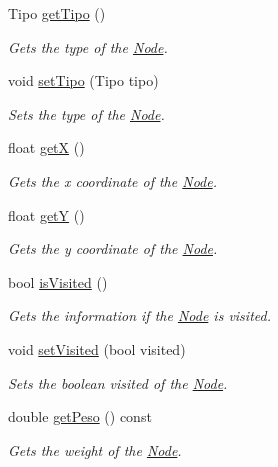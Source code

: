 \begin{DoxyCompactItemize}
Tipo \mbox{\hyperlink{class_node_a6ef1b0b19699e0b03c024121f8d5a340}{get\+Tipo}} ()
\begin{DoxyCompactList}\small\item\em Gets the type of the \mbox{\hyperlink{class_node}{Node}}. \end{DoxyCompactList}\item 
\mbox{\label{class_node_a806cee9c8ec4bcfd2f9ce8031b089b29}} 
void \mbox{\hyperlink{class_node_a806cee9c8ec4bcfd2f9ce8031b089b29}{set\+Tipo}} (Tipo tipo)
\begin{DoxyCompactList}\small\item\em Sets the type of the \mbox{\hyperlink{class_node}{Node}}. \end{DoxyCompactList}\item 
float \mbox{\hyperlink{class_node_a98ba03ab2272a479d3173932a40c3a41}{getX}} ()
\begin{DoxyCompactList}\small\item\em Gets the x coordinate of the \mbox{\hyperlink{class_node}{Node}}. \end{DoxyCompactList}\item 
float \mbox{\hyperlink{class_node_a55366d94e5244071158b45b31c43dd8b}{getY}} ()
\begin{DoxyCompactList}\small\item\em Gets the y coordinate of the \mbox{\hyperlink{class_node}{Node}}. \end{DoxyCompactList}\item 
bool \mbox{\hyperlink{class_node_a91d335587ff4158d88771feccf361b74}{is\+Visited}} ()
\begin{DoxyCompactList}\small\item\em Gets the information if the \mbox{\hyperlink{class_node}{Node}} is visited. \end{DoxyCompactList}\item 
\mbox{\label{class_node_a6fe3ebcd0eaf9fece72dfbc0ffc257bb}} 
void \mbox{\hyperlink{class_node_a6fe3ebcd0eaf9fece72dfbc0ffc257bb}{set\+Visited}} (bool visited)
\begin{DoxyCompactList}\small\item\em Sets the boolean visited of the \mbox{\hyperlink{class_node}{Node}}. \end{DoxyCompactList}\item 
double \mbox{\hyperlink{class_node_a5999ff5a455f3c4ad55712ffee832ee3}{get\+Peso}} () const
\begin{DoxyCompactList}\small\item\em Gets the weight of the \mbox{\hyperlink{class_node}{Node}}. \end{DoxyCompactList}\item 

\end{DoxyCompactItemize}
